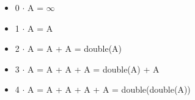 \begin{itemize}
    \item[] 0 $\cdot$ A = $\infty$
    \item[] 1 $\cdot$ A = A
    \item[] 2 $\cdot$ A = A + A = double(A)
    \item[] 3 $\cdot$ A = A + A + A = double(A) + A
    \item[] 4 $\cdot$ A = A + A + A + A = double(double(A))
\end{itemize}

